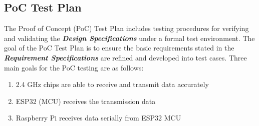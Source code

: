 \subsection{PoC Test Plan}
\medskip
The Proof of Concept (PoC) Test Plan includes testing procedures for verifying and validating the \textbf{\textit{Design Specifications}} under a formal test environment. The goal of the PoC Test Plan is to ensure the basic requirements stated in the \textbf{\textit{Requirement Specifications}} are refined and developed into test cases. Three main goals for the PoC testing are as follows:
\begin{enumerate}
    \item 2.4 GHz chips are able to receive and transmit data accurately
    \item ESP32 (MCU) receives the transmission data 
    \item Raspberry Pi receives data serially from ESP32 MCU
\end{enumerate}

